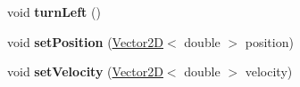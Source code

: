 \begin{DoxyCompactItemize}
\item 
\hypertarget{class_collidable_a807824d4a255e9d0c48464a6f67e9837}{}void {\bfseries turn\+Left} ()\label{class_collidable_a807824d4a255e9d0c48464a6f67e9837}

\item 
\hypertarget{class_collidable_ab4a89fa87f6e2ea151c5e8c9e80847b3}{}void {\bfseries set\+Position} (\hyperlink{class_vector2_d}{Vector2\+D}$<$ double $>$ position)\label{class_collidable_ab4a89fa87f6e2ea151c5e8c9e80847b3}

\item 
\hypertarget{class_collidable_a3b218cc8ee1f40a5cfce42b764615ac6}{}void {\bfseries set\+Velocity} (\hyperlink{class_vector2_d}{Vector2\+D}$<$ double $>$ velocity)\label{class_collidable_a3b218cc8ee1f40a5cfce42b764615ac6}

\end{DoxyCompactItemize}

